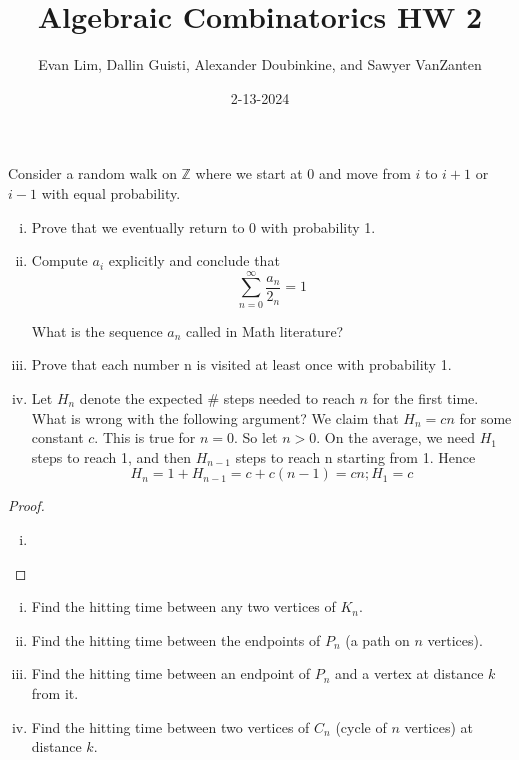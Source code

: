\documentclass[11pt]{scrartcl}
\title{Algebraic Combinatorics HW 2}
\author{Evan Lim, Dallin Guisti, Alexander Doubinkine, and Sawyer VanZanten}
\date{2-13-2024}
\begin{document}
\maketitle
\setcounter{section}{1}
\begin{problem}
    Consider a random walk on $\mathbb{Z}$ where we start at 0 and move from $i$ to $i + 1$ or $i - 1$ with equal probability.

    \begin{enumerate}[(i)]
        \item Prove that we eventually return to 0 with probability 1.
        \item Compute $a_i$ explicitly and conclude that
        \[
            \sum_{n=0}^{\infty} \frac{a_n}{2_n} = 1
        \]

        What is the sequence ${a_n}$ called in Math literature?
        \item Prove that each number n is visited at least once with probability 1.
        \item Let $H_n$ denote the expected \# steps needed to reach $n$ for the first time. What is wrong with the
        following argument?
        We claim that $H_n = cn$ for some constant $c$. This is true for $n = 0$. So let $n > 0$. On the average, we need $H_1$ steps to reach 1, and then $H_{n-1}$ steps to reach n starting from 1. Hence
        \[
            H_n = 1 + H_{n-1} = c + c(n-1) = cn ; H_1 = c
        \]
    \end{enumerate}
\end{problem}
\begin{proof}
    \begin{enumerate}[(i)]
        \item 
    \end{enumerate}
\end{proof}
\begin{problem}[\textcolor{red}{Some examples of Hitting times}]
    \begin{enumerate}[(i)]
        \item Find the hitting time between any two vertices of $K_n$.
        \item Find the hitting time between the endpoints of $P_n$ (a path on $n$ vertices).
        \item Find the hitting time between an endpoint of $P_n$ and a vertex at distance $k$ from it.
        \item Find the hitting time between two vertices of $C_n$ (cycle of $n$ vertices) at distance $k$.
    \end{enumerate}
\end{problem}
\end{document}
